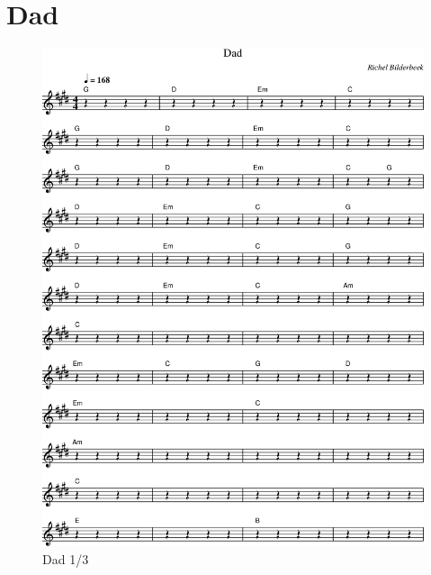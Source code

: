 \chapter{Dad}

%

\begin{figure}[!htbp]
  \includegraphics[width=\textwidth,height=\textheight,keepaspectratio]{../songs/xx_dad-0.png}
  \caption{Dad 1/3}
  \label{fig:xx_dad_1}
\end{figure}

